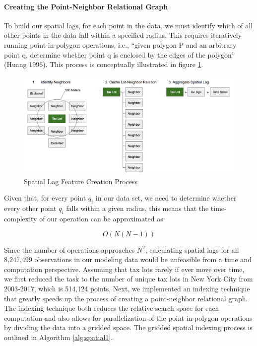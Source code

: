 \documentclass[12pt,]{article}
\let\oldparagraph\paragraph
\renewcommand{\paragraph}[1]{\oldparagraph{#1}\mbox{}}
\begin{document}
\hypertarget{creating-the-point-neighbor-relational-graph}{%
\paragraph{Creating the Point-Neighbor Relational
Graph}\label{creating-the-point-neighbor-relational-graph}}

To build our spatial lags, for each point in the data, we must identify
which of all other points in the data fall within a specified radius.
This requires iteratively running point-in-polygon operations, i.e.,
``given polygon P and an arbitrary point q, determine whether point q is
enclosed by the edges of the polygon'' (Huang 1996). This process is
conceptually illustrated in figure
\ref{fig:Spatial Lag Feataure Process}.

\begin{figure}[H]
\includegraphics[width=1\linewidth]{Sections/tables and figures/Spatial Lag Creation} \caption{Spatial Lag Feature Creation Process}\label{fig:Spatial Lag Feataure Process}
\end{figure}

Given that, for every point \(q_i\) in our data set, we need to
determine whether every other point \(q_i\) falls within a given radius,
this means that the time-complexity of our operation can be approximated
as:

\[
O(N(N-1))
\]

Since the number of operations approaches \(N^2\), calculating spatial
lags for all 8,247,499 observations in our modeling data would be
unfeasible from a time and computation perspective. Assuming that tax
lots rarely if ever move over time, we first reduced the task to the
number of unique tax lots in New York City from 2003-2017, which is
514,124 points. Next, we implemented an indexing technique that greatly
speeds up the process of creating a point-neighbor relational graph. The
indexing technique both reduces the relative search space for each
computation and also allows for parallelization of the point-in-polygon
operations by dividing the data into a gridded space. The gridded
spatial indexing process is outlined in Algorithm \ref{alg:spatial1}.
\end{document}
